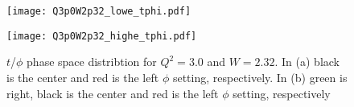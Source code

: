 \begin{figure}
  \centering
  \begin{minipage}[b]{0.48\linewidth}
    \texttt{[image: Q3p0W2p32\_lowe\_tphi.pdf]}
  \end{minipage}
  \hfill
  \begin{minipage}[b]{0.48\linewidth}
    \texttt{[image: Q3p0W2p32\_highe\_tphi.pdf]}
  \end{minipage}  
  \caption{$t$/$\phi$ phase space distribtion for $Q^2=3.0$ and $W=2.32$. In (a) black is the center and red is the left $\phi$ setting, respectively. In (b) green is right, black is the center and red is the left $\phi$ setting, respectively}
  \label{fig:Q3p0W2p32_tphi}
\end{figure}

